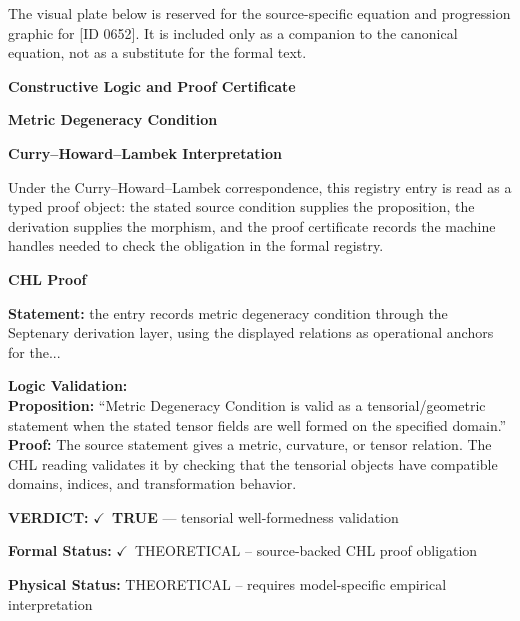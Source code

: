 \begingroup\footnotesize\sloppy
The visual plate below is reserved for the source-specific equation and progression graphic for [ID 0652]. It is included only as a companion to the canonical equation, not as a substitute for the formal text.
\par\endgroup
\ifTZPDarkEdition
{}
\fi

\clearpage
\begingroup\tzpsupportsetup
\noindent\textbf{\fontsize{10.8pt}{12.8pt}\selectfont [ID 0652] Constructive Logic and Proof Certificate}\par
\noindent\textbf{\fontsize{10pt}{12pt}\selectfont Metric Degeneracy Condition}\par
\vspace{0.45em}
\begingroup
\footnotesize
\setlength{\parskip}{0.22em}
\setlength{\parindent}{0pt}
\noindent\textbf{Curry--Howard--Lambek Interpretation}\par
Under the Curry--Howard--Lambek correspondence, this registry entry is read as a typed proof
object: the stated source condition supplies the proposition, the derivation supplies the
morphism, and the proof certificate records the machine handles needed to check the obligation
in the formal registry.

\vspace{0.45em}
\noindent\textbf{CHL Proof}\par
\textbf{Statement:} the entry records metric degeneracy condition through the Septenary derivation layer,
using the displayed relations as operational anchors for the...

\textbf{Logic Validation:}\\
\textbf{Proposition:} ``Metric Degeneracy Condition is valid as a tensorial/geometric statement when the stated
tensor fields are well formed on the specified domain.''\\
\textbf{Proof:} The source statement gives a metric, curvature, or tensor relation. The CHL reading
validates it by checking that the tensorial objects have compatible domains, indices,
and transformation behavior.

\textbf{VERDICT:} \ensuremath{\checkmark}\ \textbf{TRUE} --- tensorial well-formedness validation

\textbf{Formal Status:} \ensuremath{\checkmark}\ THEORETICAL -- source-backed CHL proof obligation

\textbf{Physical Status:} THEORETICAL -- requires model-specific empirical interpretation
\par\vspace{0.45em}
\par
\ifTZPDarkEdition
{}
\fi
\endgroup
\endgroup
